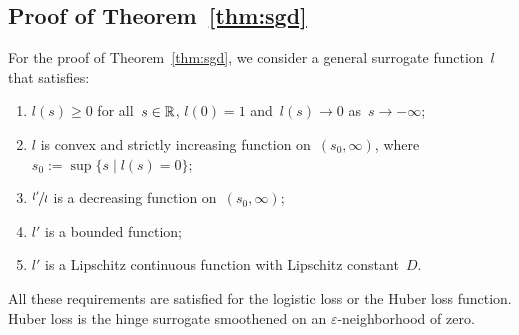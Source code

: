 \subsection{Proof of Theorem~\ref{thm:sgd}}\label{app:sgd2}

For the proof of Theorem~\ref{thm:sgd}, we consider a general surrogate function~$l$ that satisfies:
\begin{enumerate}[label={(\textbf{S\arabic*})}, left = 15pt]
  \item \label{surr_basic1} $l(s)\geq 0$ for all~$s\in\mathbb{R}$, $l(0)=1$ and~$l(s)\to 0$ as~$s\to-\infty$;
  \item \label{surr_basic2} $l$ is convex and strictly increasing function on~$(s_0,\infty)$, where~$s_0:=\sup\{s \mid l(s)=0\}$;
  \item \label{surr_ratio} $\nicefrac{l'}{l}$ is a decreasing function on~$(s_0,\infty)$;
  \item \label{surr_der1} $l'$ is a bounded function;
  \item \label{surr_der2} $l'$ is a Lipschitz continuous function with Lipschitz constant~$D$.
\end{enumerate}
All these requirements are satisfied for the logistic loss or the Huber loss function. Huber loss is the hinge surrogate smoothened on an $\varepsilon$-neighborhood of zero.

